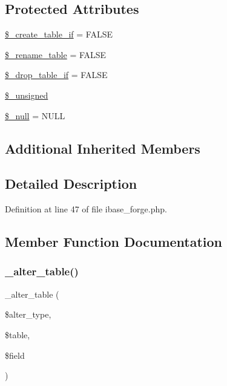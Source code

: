 \subsection*{Protected Attributes}
\begin{DoxyCompactItemize}
\item 
\mbox{\hyperlink{class_c_i___d_b__ibase__forge_a2f6484fcb8d1dc3eef67a637227cd583}{\$\+\_\+create\+\_\+table\+\_\+if}} = F\+A\+L\+SE
\item 
\mbox{\hyperlink{class_c_i___d_b__ibase__forge_a1a649e7cf9de16bcf932977b18bc91de}{\$\+\_\+rename\+\_\+table}} = F\+A\+L\+SE
\item 
\mbox{\hyperlink{class_c_i___d_b__ibase__forge_a92a8a9145a7fc91e252e58d019373581}{\$\+\_\+drop\+\_\+table\+\_\+if}} = F\+A\+L\+SE
\item 
\mbox{\hyperlink{class_c_i___d_b__ibase__forge_aae977ae6d61fa183f0b25422b6ddc31c}{\$\+\_\+unsigned}}
\item 
\mbox{\hyperlink{class_c_i___d_b__ibase__forge_ae58fe6a5104d4a069a49b27533ce808f}{\$\+\_\+null}} = \textquotesingle{}N\+U\+LL\textquotesingle{}
\end{DoxyCompactItemize}
\subsection*{Additional Inherited Members}


\subsection{Detailed Description}


Definition at line 47 of file ibase\+\_\+forge.\+php.



\subsection{Member Function Documentation}
\mbox{\label{class_c_i___d_b__ibase__forge_a41c6cae02f2fda8b429ad0afb9509426}} 
\subsubsection{\texorpdfstring{\_alter\_table()}{\_alter\_table()}}
{\footnotesize\ttfamily \+\_\+alter\+\_\+table (\begin{DoxyParamCaption}\item[{}]{\$alter\+\_\+type,  }\item[{}]{\$table,  }\item[{}]{\$field }\end{DoxyParamCaption})\hspace{0.3cm}{\ttfamily [protected]}}


